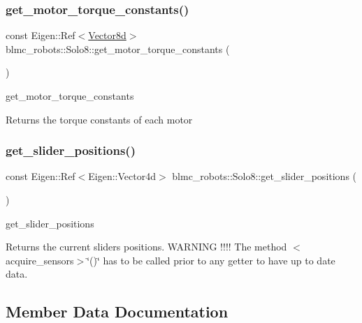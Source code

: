 \subsubsection{\texorpdfstring{get\+\_\+motor\+\_\+torque\+\_\+constants()}{get\_motor\_torque\_constants()}}
{\footnotesize\ttfamily const Eigen\+::\+Ref$<$\hyperlink{common__header_8hpp_a98975ffbe0bca1296078e0350dfedd60}{Vector8d}$>$ blmc\+\_\+robots\+::\+Solo8\+::get\+\_\+motor\+\_\+torque\+\_\+constants (\begin{DoxyParamCaption}{ }\end{DoxyParamCaption})\hspace{0.3cm}{\ttfamily [inline]}}



get\+\_\+motor\+\_\+torque\+\_\+constants 

\begin{DoxyReturn}{Returns}
the torque constants of each motor 
\end{DoxyReturn}
\mbox{\label{classblmc__robots_1_1Solo8_ab63c523c0215a19f3a27fba33b4055c0}} 
\subsubsection{\texorpdfstring{get\+\_\+slider\+\_\+positions()}{get\_slider\_positions()}}
{\footnotesize\ttfamily const Eigen\+::\+Ref$<$Eigen\+::\+Vector4d$>$ blmc\+\_\+robots\+::\+Solo8\+::get\+\_\+slider\+\_\+positions (\begin{DoxyParamCaption}{ }\end{DoxyParamCaption})\hspace{0.3cm}{\ttfamily [inline]}}



get\+\_\+slider\+\_\+positions 

\begin{DoxyReturn}{Returns}
the current sliders positions. W\+A\+R\+N\+I\+NG !!!! The method $<$acquire\+\_\+sensors$>$\char`\"{}()\char`\"{} has to be called prior to any getter to have up to date data. 
\end{DoxyReturn}


\subsection{Member Data Documentation}
\mbox{\label{classblmc__robots_1_1Solo8_a25153421bca095a344408e055f3794b6}} 
